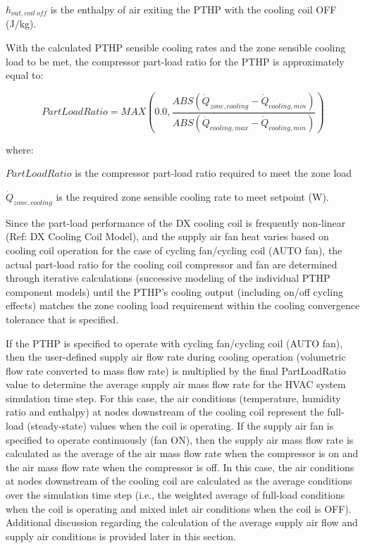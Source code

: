 \(h_{out,coil~off}\) is the enthalpy of air exiting the PTHP with the cooling coil OFF (J/kg).

With the calculated PTHP sensible cooling rates and the zone sensible cooling load to be met, the compressor part-load ratio for the PTHP is approximately equal to:

\begin{equation}
  PartLoadRatio = MAX \left( 0.0, \frac{ABS \left( \dot{Q}_{zone,cooling} - \dot{Q}_{cooling,min} \right)}{ABS \left( \dot{Q}_{cooling,max} - \dot{Q}_{cooling,min} \right)} \right)
\end{equation}

where:

\(PartLoadRatio\) is the compressor part-load ratio required to meet the zone load

\(\dot{Q}_{zone,cooling}\) is the required zone sensible cooling rate to meet setpoint (W).

Since the part-load performance of the DX cooling coil is frequently non-linear (Ref: DX Cooling Coil Model), and the supply air fan heat varies based on cooling coil operation for the case of cycling fan/cycling coil (AUTO fan), the actual part-load ratio for the cooling coil compressor and fan are determined through iterative calculations (successive modeling of the individual PTHP component models) until the PTHP's cooling output (including on/off cycling effects) matches the zone cooling load requirement within the cooling convergence tolerance that is specified.

If the PTHP is specified to operate with cycling fan/cycling coil (AUTO fan), then the user-defined supply air flow rate during cooling operation (volumetric flow rate converted to mass flow rate) is multiplied by the final PartLoadRatio value to determine the average supply air mass flow rate for the HVAC system simulation time step. For this case, the air conditions (temperature, humidity ratio and enthalpy) at nodes downstream of the cooling coil represent the full-load (steady-state) values when the coil is operating. If the supply air fan is specified to operate continuously (fan ON), then the supply air mass flow rate is calculated as the average of the air mass flow rate when the compressor is on and the air mass flow rate when the compressor is off. In this case, the air conditions at nodes downstream of the cooling coil are calculated as the average conditions over the simulation time step (i.e., the weighted average of full-load conditions when the coil is operating and mixed inlet air conditions when the coil is OFF). Additional discussion regarding the calculation of the average supply air flow and supply air conditions is provided later in this section.

